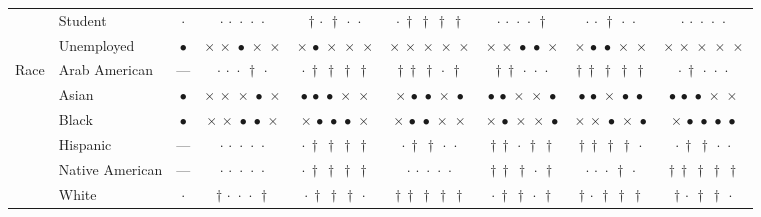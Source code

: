 {\begin{longtable}[t]{llccccccc}
 & Student & $\cdot$ & ${\cdot}\,{\cdot}\,{\cdot}\,{\cdot}\,{\cdot}$ & ${\dagger}\,{\cdot}\,{\dagger}\,{\cdot}\,{\cdot}$ & ${\cdot}\,{\dagger}\,{\dagger}\,{\dagger}\,{\dagger}$ & ${\cdot}\,{\cdot}\,{\cdot}\,{\cdot}\,{\dagger}$ & ${\cdot}\,{\cdot}\,{\dagger}\,{\cdot}\,{\cdot}$ & ${\cdot}\,{\cdot}\,{\cdot}\,{\cdot}\,{\cdot}$ \\
 & Unemployed & $\bullet$ & ${\times}\,{\times}\,{\bullet}\,{\times}\,{\times}$ & ${\times}\,{\bullet}\,{\times}\,{\times}\,{\times}$ & ${\times}\,{\times}\,{\times}\,{\times}\,{\times}$ & ${\times}\,{\times}\,{\bullet}\,{\bullet}\,{\times}$ & ${\times}\,{\bullet}\,{\bullet}\,{\times}\,{\times}$ & ${\times}\,{\times}\,{\times}\,{\times}\,{\times}$ \\
\cline{1-9}
\multirow[t]{6}{*}{Race} & Arab American & --- & ${\cdot}\,{\cdot}\,{\cdot}\,{\dagger}\,{\cdot}$ & ${\cdot}\,{\dagger}\,{\dagger}\,{\dagger}\,{\dagger}$ & ${\dagger}\,{\dagger}\,{\dagger}\,{\cdot}\,{\dagger}$ & ${\dagger}\,{\dagger}\,{\cdot}\,{\cdot}\,{\cdot}$ & ${\dagger}\,{\dagger}\,{\dagger}\,{\dagger}\,{\dagger}$ & ${\cdot}\,{\dagger}\,{\cdot}\,{\cdot}\,{\cdot}$ \\
 & Asian & $\bullet$ & ${\times}\,{\times}\,{\times}\,{\bullet}\,{\times}$ & ${\bullet}\,{\bullet}\,{\bullet}\,{\times}\,{\times}$ & ${\times}\,{\bullet}\,{\bullet}\,{\times}\,{\bullet}$ & ${\bullet}\,{\bullet}\,{\times}\,{\times}\,{\bullet}$ & ${\bullet}\,{\bullet}\,{\times}\,{\bullet}\,{\bullet}$ & ${\bullet}\,{\bullet}\,{\bullet}\,{\times}\,{\times}$ \\
 & Black & $\bullet$ & ${\times}\,{\times}\,{\bullet}\,{\bullet}\,{\times}$ & ${\times}\,{\bullet}\,{\bullet}\,{\bullet}\,{\times}$ & ${\times}\,{\bullet}\,{\bullet}\,{\times}\,{\times}$ & ${\times}\,{\bullet}\,{\times}\,{\times}\,{\bullet}$ & ${\times}\,{\times}\,{\bullet}\,{\times}\,{\bullet}$ & ${\times}\,{\bullet}\,{\bullet}\,{\bullet}\,{\bullet}$ \\
 & Hispanic & --- & ${\cdot}\,{\cdot}\,{\cdot}\,{\cdot}\,{\cdot}$ & ${\cdot}\,{\dagger}\,{\dagger}\,{\dagger}\,{\dagger}$ & ${\cdot}\,{\dagger}\,{\dagger}\,{\cdot}\,{\cdot}$ & ${\dagger}\,{\dagger}\,{\cdot}\,{\dagger}\,{\dagger}$ & ${\dagger}\,{\dagger}\,{\dagger}\,{\dagger}\,{\cdot}$ & ${\cdot}\,{\dagger}\,{\dagger}\,{\cdot}\,{\cdot}$ \\
 & Native American & --- & ${\cdot}\,{\cdot}\,{\cdot}\,{\cdot}\,{\cdot}$ & ${\cdot}\,{\dagger}\,{\dagger}\,{\dagger}\,{\dagger}$ & ${\cdot}\,{\cdot}\,{\cdot}\,{\cdot}\,{\cdot}$ & ${\dagger}\,{\dagger}\,{\dagger}\,{\cdot}\,{\dagger}$ & ${\cdot}\,{\cdot}\,{\cdot}\,{\dagger}\,{\cdot}$ & ${\dagger}\,{\dagger}\,{\dagger}\,{\dagger}\,{\dagger}$ \\
 & White & $\cdot$ & ${\dagger}\,{\cdot}\,{\cdot}\,{\cdot}\,{\dagger}$ & ${\cdot}\,{\dagger}\,{\dagger}\,{\dagger}\,{\cdot}$ & ${\dagger}\,{\dagger}\,{\dagger}\,{\dagger}\,{\dagger}$ & ${\cdot}\,{\dagger}\,{\dagger}\,{\cdot}\,{\dagger}$ & ${\dagger}\,{\cdot}\,{\dagger}\,{\dagger}\,{\dagger}$ & ${\dagger}\,{\cdot}\,{\dagger}\,{\dagger}\,{\cdot}$ \\
\cline{1-9}
\end{longtable}
}

